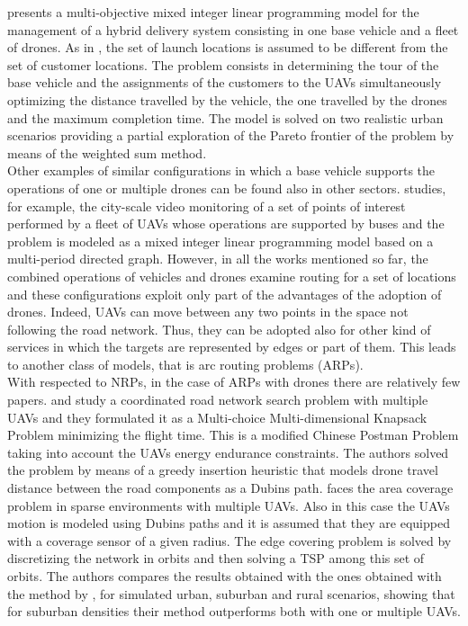 \cite{art:Amorosi2020} presents a multi-objective mixed integer linear programming model for the management of a hybrid delivery system consisting in one base vehicle and a fleet of drones. As in \cite{art:Poikonen2020}, the set of launch locations is assumed to be different from the set of customer locations. The problem consists in determining the tour of the base vehicle and the assignments of the customers to the UAVs simultaneously optimizing the distance travelled by the vehicle, the one travelled by the drones and the maximum completion time. The model is solved on two realistic urban scenarios providing a partial exploration of the Pareto frontier of the problem by means of the weighted sum method.\\
Other examples of similar configurations in which a base vehicle supports the operations of one or multiple drones can be found also in other sectors. 
\cite{art:Trotta2018} studies, for example, the city-scale video monitoring of a set of points of interest performed by a fleet of UAVs whose operations are supported by buses and the problem is modeled as a mixed integer linear programming model based on a multi-period directed graph.
However, in all the works mentioned so far, the combined operations of vehicles and drones examine routing for a set of locations and these configurations exploit only part of the advantages of the adoption of drones. Indeed, UAVs can move between any two points in the space not following the road network. Thus, they can be adopted also for other kind of services in which the targets are represented by edges or part of them. This leads to another class of models, that is arc routing problems (ARPs).\\
With respected to NRPs, in the case of ARPs with drones there are relatively few papers. \cite{art:Oh2011} and \cite{art:Oh2014} study a coordinated road network search problem with multiple UAVs and they formulated it as a Multi-choice Multi-dimensional Knapsack Problem minimizing the flight time. This is a modified Chinese Postman Problem taking into account the UAVs energy endurance constraints. The authors solved the problem by means of a greedy insertion heuristic that models drone travel distance between the road components as a Dubins path.
\cite{art:Dille2013} faces the area coverage problem in sparse environments with multiple UAVs. Also in this case the UAVs motion is modeled using Dubins paths and it is assumed that they are equipped with a coverage sensor of a given radius.
The edge covering problem is solved by discretizing the network in orbits and then solving a TSP among this set of orbits. The authors compares the results obtained with the ones obtained with the method by \cite{art:Oh2014}, for simulated urban, suburban and rural scenarios, showing that for suburban densities their method outperforms both with one or multiple UAVs. 
